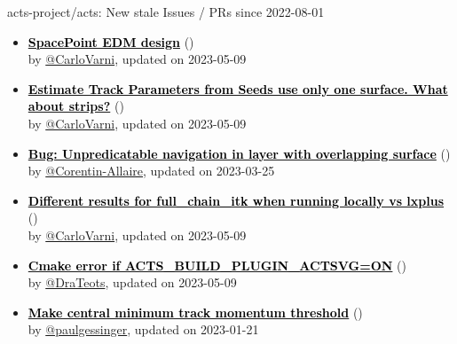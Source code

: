 \begin{frame}[allowframebreaks]{ acts-project/acts: New stale Issues / PRs since 2022-08-01 }
\begin{itemize}
    \item\iss\prstale\textbf{\href{https://github.com/acts-project/acts/issues/1971}{\textcolor{black}{SpacePoint EDM design}}}
    (\href{https://github.com/acts-project/acts/issues/1971}{}) \\
    by \href{https://github.com/CarloVarni}{@CarloVarni}, updated on 2023-05-09

    \item\iss\prstale\textbf{\href{https://github.com/acts-project/acts/issues/1895}{\textcolor{black}{Estimate Track Parameters from Seeds use only one surface. What about strips?}}}
    (\href{https://github.com/acts-project/acts/issues/1895}{}) \\
    by \href{https://github.com/CarloVarni}{@CarloVarni}, updated on 2023-05-09

    \item\iss\prstale\textbf{\href{https://github.com/acts-project/acts/issues/1852}{\textcolor{black}{Bug: Unpredicatable navigation in layer with overlapping surface}}}
    (\href{https://github.com/acts-project/acts/issues/1852}{}) \\
    by \href{https://github.com/Corentin-Allaire}{@Corentin-Allaire}, updated on 2023-03-25

    \item\iss\prstale\textbf{\href{https://github.com/acts-project/acts/issues/1819}{\textcolor{black}{Different results for full\_chain\_itk when running locally vs lxplus}}}
    (\href{https://github.com/acts-project/acts/issues/1819}{}) \\
    by \href{https://github.com/CarloVarni}{@CarloVarni}, updated on 2023-05-09

    \item\iss\prstale\textbf{\href{https://github.com/acts-project/acts/issues/1818}{\textcolor{black}{Cmake error if ACTS\_BUILD\_PLUGIN\_ACTSVG=ON}}}
    (\href{https://github.com/acts-project/acts/issues/1818}{}) \\
    by \href{https://github.com/DraTeots}{@DraTeots}, updated on 2023-05-09

    \item\iss\prstale\textbf{\href{https://github.com/acts-project/acts/issues/1761}{\textcolor{black}{Make central minimum track momentum threshold}}}
    (\href{https://github.com/acts-project/acts/issues/1761}{}) \\
    by \href{https://github.com/paulgessinger}{@paulgessinger}, updated on 2023-01-21


\end{itemize}
\end{frame}
